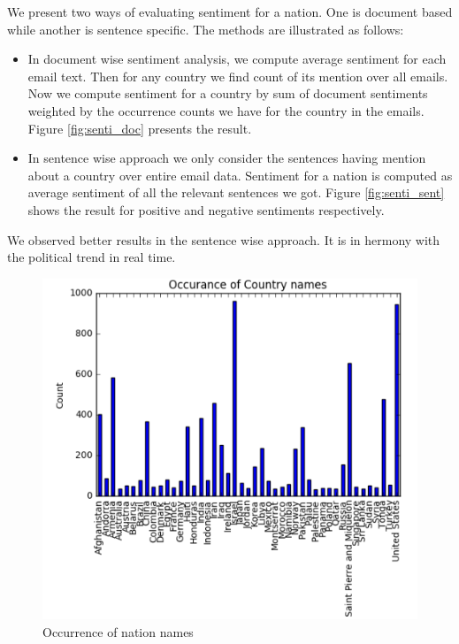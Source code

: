 \documentclass{article} %
\begin{document}
We present two ways of evaluating sentiment for a nation. One is document based while another is sentence specific. The methods are illustrated as follows:
\begin{itemize}
\item In document wise sentiment analysis, we compute average sentiment for each email text. Then for any country we find count of its mention over all emails. Now we compute sentiment for a country by sum of document sentiments weighted by the occurrence counts we have for the country in the emails. Figure \ref{fig:senti_doc} presents the result.
\item In sentence wise approach we only consider the sentences having mention about a country over entire email data. Sentiment for a nation is computed as average sentiment of all the relevant sentences we got. Figure \ref{fig:senti_sent} shows the result for positive and negative sentiments respectively.
\end{itemize}

We observed better results in the sentence wise approach. It is in hermony with the political trend in real time.

\begin{figure}[t!]
\center
\includegraphics[scale=0.5]{pix/nation_cnt.png}
\caption{Occurrence of nation names}
\label{fig:nation_cnt}
\end{figure}
\end{document}
